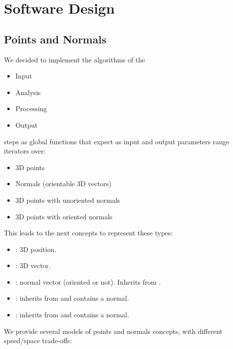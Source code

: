 \section{Software Design}

\subsection{Points and Normals}

We decided to implement the algorithms of the \\
\begin{itemize}
\item Input
\item Analysis
\item Processing
\item Output
\end{itemize}
steps as global functions that expect as input and output parameters range iterators over:

\begin{itemize}
\item 3D points
\item Normals (orientable 3D vectors)
\item 3D points with unoriented normals
\item 3D points with oriented normals
\end{itemize}

This leads to the next concepts to represent these types:

\begin{itemize}
\item {}: 3D position.
\item {}: 3D vector.
\item {}: normal vector (oriented or not). Inherits from .
\item {}: inherits from  and contains a  normal.
\item {}: inherits from  and contains a  normal.
\end{itemize}

We provide several models of points and normals concepts, with different speed/space trade-offs:


